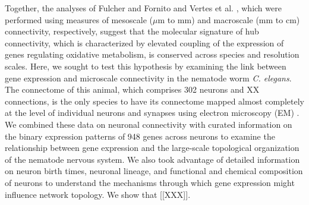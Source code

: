 \documentclass[10pt,letterpaper]{article}
\begin{document}
Together, the analyses of Fulcher and Fornito \cite{Fulcher:2016ck} and Vertes et al. \cite{Vertes2016a}, which were performed using measures of mesoscale ($\mu$m to mm) and macroscale (mm to cm) connectivity, respectively, suggest that the molecular signature of hub connectivity, which is characterized by elevated coupling of the expression of genes regulating oxidative metabolism, is conserved across species and resolution scales.
Here, we sought to test this hypothesis by examining the link between gene expression and microscale connectivity in the nematode worm \emph{C. elegans}.
The connectome of this animal, which comprises 302 neurons and XX connections, is the only species to have its connectome mapped almost completely at the level of individual neurons and synapses using electron microscopy (EM) \cite{White:1986tx, Varshney2011}.
We combined these data on neuronal connectivity with curated information on the binary expression patterns of 948 genes across neurons to examine the relationship between gene expression and the large-scale topological organization of the nematode nervous system.
We also took advantage of detailed information on neuron birth times, neuronal lineage, and functional and chemical composition of neurons to understand the mechanisms through which gene expression might influence network topology.
We show that [[XXX]].


\end{document}
